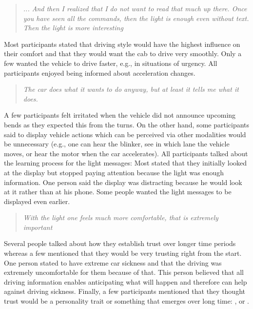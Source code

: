 \begin{quotation}\emph{... And then I realized that I do not want to read that much up there. Once you have seen all the commands, then the light is enough even without text. Then the light is more interesting}\end{quotation}
Most participants stated that driving style would have the highest influence on their comfort and that they would want the cab to drive very smoothly. Only a few wanted the vehicle to drive faster, e.g., in situations of urgency. All participants enjoyed being informed about acceleration changes.
\begin{quotation}\emph{The car does what it wants to do anyway, but at least it tells me what it does.}\end{quotation}
A few participants felt irritated when the vehicle did not announce upcoming bends as they expected this from the turns. On the other hand, some participants said to display vehicle actions which can be perceived via other modalities would be unnecessary (e.g., one can hear the blinker, see in which lane the vehicle moves, or hear the motor when the car accelerates). All participants talked about the learning process for the light messages: Most stated that they initially looked at the display but stopped paying attention because the light was enough information. One person said the display was distracting because he would look at it rather than at his phone. Some people wanted the light messages to be displayed even earlier. \begin{quotation}\emph{
With the light one feels much more comfortable, that is extremely important}\end{quotation}
Several people talked about how they establish trust over longer time periods whereas a few mentioned that they would be very trusting right from the start. One person stated to have extreme car sickness and that the driving was extremely uncomfortable for them because of that. This person believed that all driving information enables anticipating what will happen and therefore can help against driving sickness. Finally, a few participants mentioned that they thought trust would be a personality trait or something that emerges over long time: , or . 

